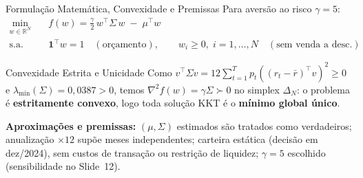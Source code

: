 \documentclass[aspectratio=43]{beamer}
\begin{document}
\begin{frame}{Formulação Matemática, Convexidade e Premissas}
  Para aversão ao risco $\gamma = 5$:
  \[
  \begin{aligned}
    \min_{w \in \mathbb{R}^N}\quad & f(w) = \frac{\gamma}{2}\, w^\top \Sigma\, w \;-\; \mu^\top w \\
    \text{s.a.}\quad & \mathbf{1}^\top w = 1 \quad (\text{orçamento}), \qquad w_i \ge 0,\; i = 1, \dots, N \quad (\text{sem venda a desc.})
  \end{aligned}
  \]

  \begin{block}{Convexidade Estrita e Unicidade}
    Como $v^\top \Sigma v = 12 \sum_{t=1}^T p_t ((r_t - \bar{r})^\top v)^2 \ge 0$ e $\lambda_{\min}(\Sigma) = 0{,}0387 > 0$, temos $\nabla^2 f(w) = \gamma\Sigma \succ 0$ no simplex $\Delta_N$: o problema é \textbf{estritamente convexo}, logo toda solução KKT é o \textbf{mínimo global único}.
  \end{block}

  \scriptsize
  \textbf{Aproximações e premissas:} $(\mu,\Sigma)$ estimados são tratados como verdadeiros; anualização $\times 12$ supõe meses independentes; carteira estática (decisão em dez/2024), sem custos de transação ou restrição de liquidez; $\gamma = 5$ escolhido (sensibilidade no Slide~12).
\end{frame}
\end{document}
